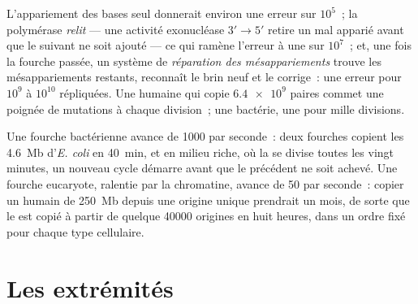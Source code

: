 \begin{proposition}[Fidélité]\label{prop:b1:replication-mitosis:fidelity}
L'appariement des bases seul donnerait environ une erreur sur $10^5$~;
la polymérase \emph{relit} --- une activité exonucléase $3' \to 5'$
retire un  mal apparié avant que le suivant ne soit ajouté ---
ce qui ramène l'erreur à une sur $10^7$~; et, une fois la fourche
passée, un système de \emph{réparation des mésappariements} trouve les
mésappariements restants, reconnaît le brin neuf et le corrige~: une
erreur pour $10^9$ à $10^{10}$  répliquées. Une 
humaine qui copie $\num{6.4e9}$ paires commet une poignée de mutations à
chaque division~; une bactérie, une pour mille divisions.
\end{proposition}

\begin{example}\label{ex:b1:replication-mitosis:speed}
Une fourche bactérienne avance de \qty{1000}{}  par
seconde~: deux fourches copient les \qty{4.6}{Mb} d'\emph{E. coli} en
\qty{40}{min}, et en milieu riche, où la  se divise toutes les
vingt minutes, un nouveau cycle démarre avant que le précédent ne soit
achevé. Une fourche eucaryote, ralentie par la chromatine, avance de
\qty{50}{} par seconde~: copier un  humain de \qty{250}{Mb}
depuis une origine unique prendrait un mois, de sorte que le  est
copié à partir de quelque \num{40000} origines en huit heures, dans un
ordre fixé pour chaque type cellulaire.
\end{example}

\section{Les extrémités}

